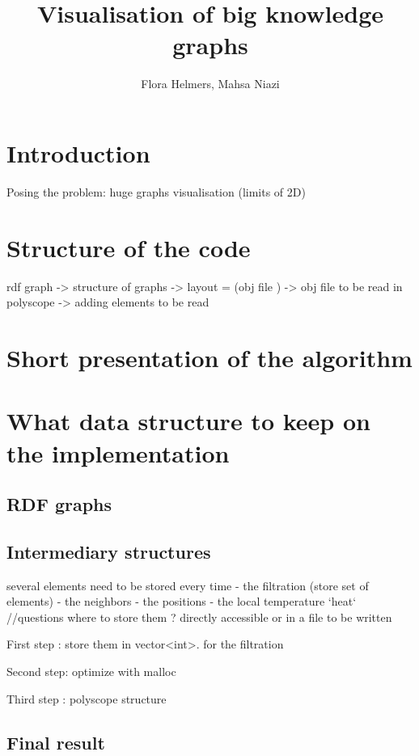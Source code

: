 \documentclass{article}
\title{Visualisation of big knowledge graphs}
\author{Flora Helmers, Mahsa Niazi}
\begin{document}
\maketitle

\section*{Introduction}
Posing the problem:
huge graphs 
visualisation (limits of 2D)


\section{Structure of the code}
rdf graph
-> 
structure of graphs
-> 
layout = (obj file )
-> 
obj file to be read in polyscope
-> 
adding elements to be read 

\section{Short presentation of the algorithm}


\section{What data structure to keep on the implementation}
\subsection{RDF  graphs}

\subsection{Intermediary structures}
several elements need to be stored every time 
- the filtration (store set of elements)
- the neighbors
- the positions 
- the local temperature `heat` 
//questions where to store them ? directly accessible or in a file to be written

First step : store them in vector<int>. 
    for the filtration

Second step: optimize with malloc

Third step : polyscope structure 


\subsection{Final result}
\end{document}
